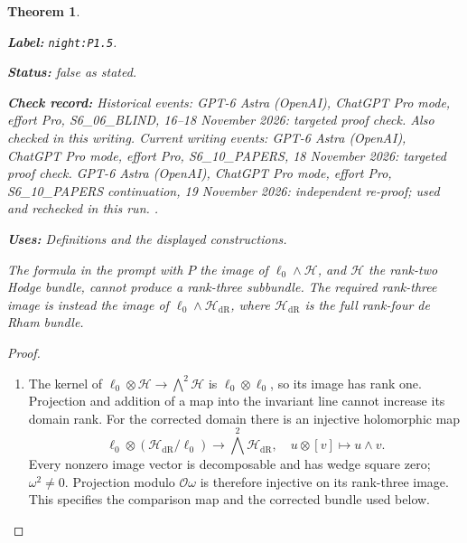 \documentclass[11pt,a4paper]{article}
\newtheorem{theorem}{Theorem}[section]
\theoremstyle{definition}
\newcommand{\StatementRecord}[4]{\par\smallskip\begingroup\upshape\raggedright\noindent\textbf{Label:} \nolinkurl{#1}.\par\noindent\textbf{Status:} #2.\par\noindent\textbf{Check record:} #3.\par\noindent\textbf{Uses:} #4.\par\endgroup\smallskip}
\begin{document}
\begin{theorem}\label{night:P1.5}
\StatementRecord{night:P1.5}{false as stated}{Historical events: GPT-6 Astra (OpenAI), ChatGPT Pro mode, effort Pro, S6\_06\_BLIND, 16--18 November 2026: targeted proof check. Also checked in this writing. Current writing events: GPT-6 Astra (OpenAI), ChatGPT Pro mode, effort Pro, S6\_10\_PAPERS, 18 November 2026: targeted proof check. GPT-6 Astra (OpenAI), ChatGPT Pro mode, effort Pro, S6\_10\_PAPERS continuation, 19 November 2026: independent re-proof; used and rechecked in this run. }{Definitions and the displayed constructions}
The formula in the prompt with $P$ the image of
$\ell_0\wedge\mathcal H$, and $\mathcal H$ the rank-two Hodge bundle,
cannot produce a rank-three subbundle.  The required rank-three image
is instead the image of $\ell_0\wedge\mathcal H_{\mathrm{dR}}$, where
$\mathcal H_{\mathrm{dR}}$ is the full rank-four de Rham bundle.
\end{theorem}
\begin{proof}
\begin{enumerate}[label=\arabic*.]
\item The kernel of $\ell_0\otimes\mathcal H\to\bigwedge^2\mathcal H$
is $\ell_0\otimes\ell_0$, so its image has rank one.  Projection and
addition of a map into the invariant line cannot increase its domain
rank.  For the corrected domain there is an injective holomorphic map
\[
\ell_0\otimes(\mathcal H_{\mathrm{dR}}/\ell_0)
 \longrightarrow\bigwedge^2\mathcal H_{\mathrm{dR}},\quad
u\otimes[v]\longmapsto u\wedge v.
\]
Every nonzero image vector is decomposable and has wedge square zero;
$\omega^2\ne0$.  Projection modulo $\mathcal O\omega$ is therefore
injective on its rank-three image.  This specifies the comparison map
and the corrected bundle used below.

\end{enumerate}
\end{proof}
\end{document}
